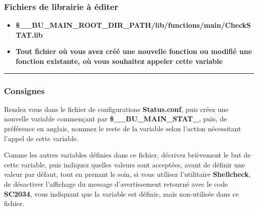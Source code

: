 \documentclass[a4paper,10pt]{article}
\begin{document}
    \color{sec3}
    \subsubsection{Fichiers de librairie à éditer}\color{text}

    \begin{justify}
        \begin{itemize}
            \item \textbf{\color{vars}\$\_\_BU\_MAIN\_ROOT\_DIR\_PATH\color{path}/lib/functions/main/CheckSTAT.lib}\\\mbox{}

            \item \textbf{Tout fichier où vous avez créé une nouvelle fonction ou modifié une fonction existante, où vous souhaitez appeler cette variable}
        \end{itemize}
    \end{justify}



    \color{sec3}\par\noindent\rule{\textwidth}{0.4pt}\color{text}

    \color{sec3}
    \subsubsection{Consignes}\color{text}

    \begin{justify}
        Rendez vous dans le fichier de configurations \textbf{\color{path}Status.conf}, puis créez une nouvelle variable commençant par \textbf{\color{vars}\$\_\_BU\_MAIN\_STAT\_}, puis, de préférence en anglais, nommez le reste de la variable selon l'action nécessitant l'appel de cette variable.
    \end{justify}

    \begin{justify}
        Comme les autres variables définies dans ce fichier, décrivez brièvement le but de cette variable, puis indiquez quelles valeurs sont acceptées, avant de définir une valeur par défaut, tout en prenant le soin, si vous utilisez l'utilitaire \textbf{\color{cmds}Shellcheck}, de désactiver l'affichage du message d'avertissement retourné avec le code \textbf{SC2034}, vous indiquant que la variable est définie, mais non-utilisée dans ce fichier.
    \end{justify}
\end{document}
